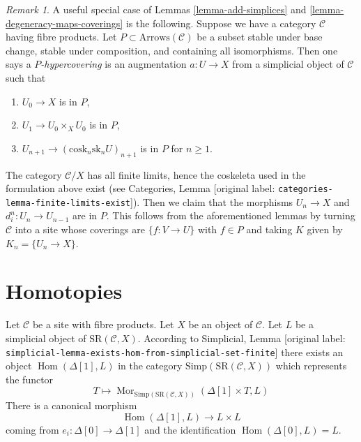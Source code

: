 \documentclass[10pt,a4paper]{article}
\theoremstyle{plain}
\theoremstyle{definition}
\theoremstyle{remark}
\newtheorem{remark}[subsection]{Remark}
\numberwithin{equation}{subsection}
\def\Hom{\mathop{\mathrm{Hom}}\nolimits}
\def\Mor{\mathop{\mathrm{Mor}}\nolimits}
\begin{document}
\begin{remark}
\label{remark-P-covering}
A useful special case of Lemmas \ref{lemma-add-simplices} and
\ref{lemma-degeneracy-maps-coverings} is the following.
Suppose we have a category $\mathcal{C}$ having fibre products.
Let $P \subset \text{Arrows}(\mathcal{C})$ be a subset
stable under base change, stable under composition,
and containing all isomorphisms. Then one says a
{\it $P$-hypercovering} is an augmentation $a : U \to X$
from a simplicial object of $\mathcal{C}$ such that
\begin{enumerate}
\item $U_0 \to X$ is in $P$,
\item $U_1 \to U_0 \times_X U_0$ is in $P$,
\item $U_{n + 1} \to (\text{cosk}_n\text{sk}_n U)_{n + 1}$
is in $P$ for $n \geq 1$.
\end{enumerate}
The category $\mathcal{C}/X$ has all finite limits, hence the
coskeleta used in the formulation above exist
(see Categories, Lemma \textnormal{[original label: \nolinkurl{categories-lemma-finite-limits-exist}]}).
Then we claim that the morphisms $U_n \to X$ and $d^n_i : U_n \to U_{n - 1}$
are in $P$. This follows from the aforementioned
lemmas by turning $\mathcal{C}$ into a site whose coverings
are $\{f : V \to U\}$ with $f \in P$ and taking $K$ given by
$K_n = \{U_n \to X\}$.
\end{remark}


\section{Homotopies}
\label{section-homotopies}

\noindent
Let $\mathcal{C}$ be a site with fibre products.
Let $X$ be an object of $\mathcal{C}$.
Let $L$ be a simplicial object of $\text{SR}(\mathcal{C}, X)$.
According to
Simplicial, Lemma \textnormal{[original label: \nolinkurl{simplicial-lemma-exists-hom-from-simplicial-set-finite}]}
there exists an object $\Hom(\Delta[1], L)$
in the category $\text{Simp}(\text{SR}(\mathcal{C}, X))$ which represents the
functor
$$
T
\longmapsto
\Mor_{\text{Simp}(\text{SR}(\mathcal{C}, X))}(\Delta[1] \times T, L)
$$
There is a canonical morphism
$$
\Hom(\Delta[1], L) \to L \times L
$$
coming from $e_i : \Delta[0] \to \Delta[1]$ and the identification
$\Hom(\Delta[0], L) = L$.
\end{document}
